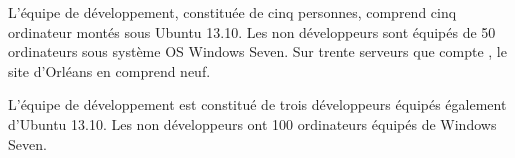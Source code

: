 

		L'équipe de développement, constituée de cinq personnes, comprend cinq ordinateur montés sous Ubuntu 13.10.
		Les non développeurs sont équipés de 50 ordinateurs sous système OS Windows Seven.
		Sur trente serveurs que compte \interlog , le site d'Orléans en comprend neuf.

		

		L'équipe de développement est constitué de trois développeurs équipés également d'Ubuntu 13.10. Les non développeurs ont 100 ordinateurs équipés de Windows Seven.

		
